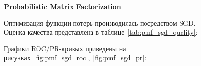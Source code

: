 \pagebreak

\vspace{1em}
\textbf{Probabilistic Matrix Factorization}

Оптимизация функции потерь производилась посредством SGD\@.\\
Оценка качества представлена в таблице~\ref{tab:pmf_sgd_quality}:

\begin{table}[h]
    \caption{Значения метрик для PMF}
    \label{tab:pmf_sgd_quality}
\end{table}

Графики ROC/PR-кривых приведены на рисунках~\ref{fig:pmf_sgd_roc},~\ref{fig:pmf_sgd_pr}:

